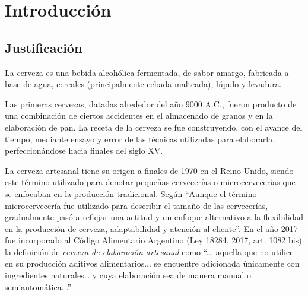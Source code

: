 \chapter{Introducción}
\section{Justificación}
    \par
    La cerveza es una bebida alcohólica fermentada, de sabor amargo, fabricada a base de agua, cereales (principalmente cebada malteada), lúpulo y levadura.
    \par
    Las primeras cervezas, datadas alrededor del año 9000 A.C., fueron producto de una combinación de ciertos accidentes en el almacenado de granos y en la elaboración de pan. La receta de la cerveza se fue construyendo, con el avance del tiempo, mediante ensayo y error de las técnicas utilizadas para elaborarla, perfeccionándose hacia finales del siglo XV.
    \par
    La cerveza artesanal tiene su origen a finales de 1970 en el Reino Unido, siendo este término utilizado para denotar pequeñas cervecerías o microcervecerías que se enfocaban en la producción tradicional. Según \cite{Calvillo17} “Aunque el término microcervecería fue utilizado para describir el tamaño de las cervecerías, gradualmente pasó a reflejar una actitud y un enfoque alternativo a la flexibilidad en la producción de cerveza, adaptabilidad y atención al cliente”. En el año 2017 fue incorporado al Código Alimentario Argentino (Ley 18284, 2017, art. 1082 bis) la definición de \textit{cerveza de elaboración artesanal} como “... aquella que no utilice en su producción aditivos alimentarios... se encuentre adicionada únicamente con ingredientes naturales… y cuya elaboración sea de manera manual o semiautomática...”
    
    
